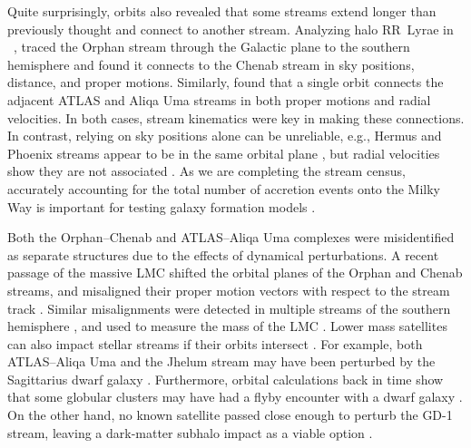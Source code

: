 \documentclass[final,5p,times,twocolumn,authoryear]{elsarticle}
\begin{document}
Quite surprisingly, orbits also revealed that some streams extend longer than previously thought and connect to another stream.
Analyzing halo RR~Lyrae in \gaia~, \citet{koposov:2019} traced the Orphan stream through the Galactic plane to the southern hemisphere and found it connects to the Chenab stream in sky positions, distance, and proper motions.
Similarly, \citet{li:2021} found that a single orbit connects the adjacent ATLAS and Aliqa Uma streams in both proper motions and radial velocities.
In both cases, stream kinematics were key in making these connections.
In contrast, relying on sky positions alone can be unreliable, e.g., Hermus and Phoenix streams appear to be in the same orbital plane \citep{grillmair:2016b}, but radial velocities show they are not associated \citep{martin:2018}.
As we are completing the stream census, accurately accounting for the total number of accretion events onto the Milky Way is important for testing galaxy formation models \citep{pillepich:2015, shipp:2023, wright:2023, khoperskov:2023}.

Both the Orphan--Chenab and ATLAS--Aliqa Uma complexes were misidentified as separate structures due to the effects of dynamical perturbations.
A recent passage of the massive LMC shifted the orbital planes of the Orphan and Chenab streams, and misaligned their proper motion vectors with respect to the stream track \citep{erkal:2019}.
Similar misalignments were detected in multiple streams of the southern hemisphere \citep{shipp:2019}, and used to measure the mass of the LMC \citep[$\gtrsim10^{11}\,\unit{\msun}$;][]{erkal:2019, shipp:2021, koposov:2023}.
Lower mass satellites can also impact stellar streams if their orbits intersect \citep[e.g.,][]{dillamore:2022}.
For example, both ATLAS--Aliqa Uma and the Jhelum stream may have been perturbed by the Sagittarius dwarf galaxy \citep[respectively; see also Section~\ref{sec:structure}]{li:2019,woudenberg:2023}.
Furthermore, orbital calculations back in time show that some globular clusters may have had a flyby encounter with a dwarf galaxy \citep{garrow:2020, el-falou:2022}.
On the other hand, no known satellite passed close enough to perturb the GD-1 stream, leaving a dark-matter subhalo impact as a viable option \citep{bonaca:2019, doke:2022}.
\end{document}
